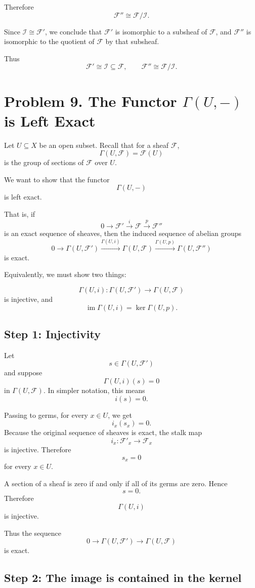 \documentclass[12pt,a4paper]{article}
\DeclareMathOperator{\im}{im}
\newcommand{\F}{\mathcal F}
\theoremstyle{notespace}
\newcommand{\Fp}{\mathcal F'}      %
\newcommand{\Fpp}{\mathcal F''}
\begin{document}
Therefore
\[
\Fpp\cong \F/\mathcal I.
\]

Since \(\mathcal I\cong \Fp\), we conclude that \(\Fp\) is isomorphic to a subsheaf of \(\F\), and \(\Fpp\) is isomorphic to the quotient of \(\F\) by that subsheaf.

Thus
\[
\boxed{
	\Fp\cong \mathcal I\subseteq \F,
	\qquad
	\Fpp\cong \F/\mathcal I.
}
\]


\section{Problem 9. The Functor \texorpdfstring{\(\Gamma(U,-)\)}{Gamma(U,-)} is Left Exact}

Let \(U\subseteq X\) be an open subset. Recall that for a sheaf \(\F\),
\[
\Gamma(U,\F)=\F(U)
\]
is the group of sections of \(\F\) over \(U\).

We want to show that the functor
\[
\Gamma(U,-)
\]
is left exact.

That is, if
\[
0\longrightarrow \Fp
\xrightarrow{i}
\F
\xrightarrow{p}
\Fpp
\]
is an exact sequence of sheaves, then the induced sequence of abelian groups
\[
0\longrightarrow \Gamma(U,\Fp)
\xrightarrow{\Gamma(U,i)}
\Gamma(U,\F)
\xrightarrow{\Gamma(U,p)}
\Gamma(U,\Fpp)
\]
is exact.

Equivalently, we must show two things:

\[
\Gamma(U,i):\Gamma(U,\Fp)\longrightarrow \Gamma(U,\F)
\]
is injective, and
\[
\im \Gamma(U,i)=\ker \Gamma(U,p).
\]

\subsection{Step 1: Injectivity}

Let
\[
s\in \Gamma(U,\Fp)
\]
and suppose
\[
\Gamma(U,i)(s)=0
\]
in \(\Gamma(U,\F)\). In simpler notation, this means
\[
i(s)=0.
\]

Passing to germs, for every \(x\in U\), we get
\[
i_x(s_x)=0.
\]
Because the original sequence of sheaves is exact, the stalk map
\[
i_x:\Fp_x\longrightarrow \F_x
\]
is injective. Therefore
\[
s_x=0
\]
for every \(x\in U\).

A section of a sheaf is zero if and only if all of its germs are zero. Hence
\[
s=0.
\]
Therefore
\[
\Gamma(U,i)
\]
is injective.

Thus the sequence
\[
0\longrightarrow \Gamma(U,\Fp)
\longrightarrow \Gamma(U,\F)
\]
is exact.

\subsection{Step 2: The image is contained in the kernel}
\end{document}

